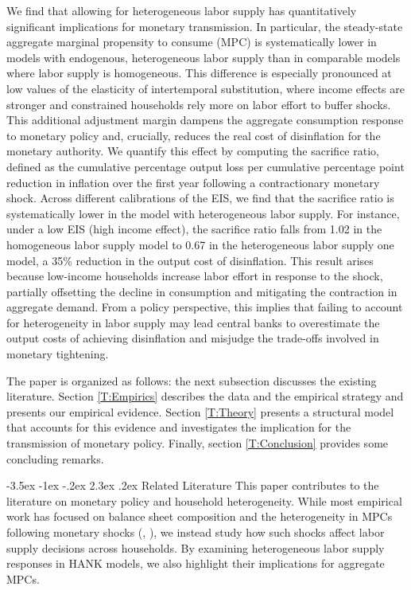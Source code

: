 \documentclass[a4paper,12pt]{article}%
\makeatletter
\renewcommand\subsection{\@startsection {subsection}{2}{\z@}%
                  {-3.5ex \@plus -1ex \@minus -.2ex}%
                  {2.3ex \@plus.2ex}%
                  {\centering\normalsize\scshape\color{black}}}
\makeatother
\begin{document}
We find that allowing for heterogeneous labor supply has quantitatively significant implications for monetary transmission. In particular, the steady-state aggregate marginal propensity to consume (MPC) is systematically lower in models with endogenous, heterogeneous labor supply than in comparable models where labor supply is homogeneous. This difference is especially pronounced at low values of the elasticity of intertemporal substitution, where income effects are stronger and constrained households rely more on labor effort to buffer shocks. 
This additional adjustment margin dampens the aggregate consumption response to monetary policy and, crucially, reduces the real cost of disinflation for the monetary authority. We quantify this effect by computing the sacrifice ratio, defined as the cumulative percentage output loss per cumulative percentage point reduction in inflation over the first year following a contractionary monetary shock. Across different calibrations of the EIS, we find that the sacrifice ratio is systematically lower in the model with heterogeneous labor supply. For instance, under a low EIS (high income effect), the sacrifice ratio falls from 1.02 in the homogeneous labor supply model to 0.67 in the heterogeneous labor supply one model, a 35\% reduction in the output cost of disinflation. This result arises because low-income households increase labor effort in response to the shock, partially offsetting the decline in consumption and mitigating the contraction in aggregate demand. From a policy perspective, this implies that failing to account for heterogeneity in labor supply may lead central banks to overestimate the output costs of achieving disinflation and misjudge the trade-offs involved in monetary tightening.

 
The paper is organized as follows: the next subsection discusses the existing literature. Section \ref{T:Empirics} describes the data and the empirical strategy and presents our empirical evidence. Section \ref{T:Theory} presents a structural model that accounts for this evidence and investigates the implication for the transmission of monetary policy. Finally, section \ref{T:Conclusion} provides some concluding remarks.

\subsection{Related Literature}\label{T:Intro:LitRev}
This paper contributes to the literature on monetary policy and household heterogeneity. While most empirical work has focused on balance sheet composition and the heterogeneity in MPCs following monetary shocks (\cite{CFS:2020}, \cite{Auclert:19}), we instead study how such shocks affect labor supply decisions across households. By examining heterogeneous labor supply responses in HANK models, we also highlight their implications for aggregate MPCs.
\end{document}
